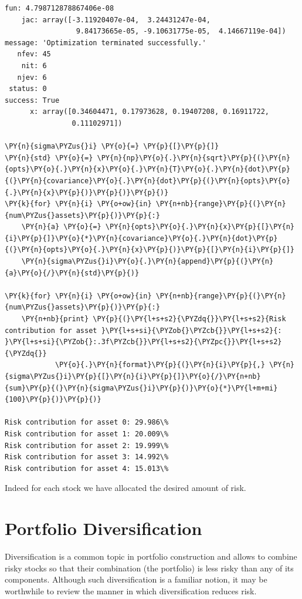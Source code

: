 \begin{tcolorbox}[breakable, size=fbox, boxrule=1pt, pad at break*=1mm,colback=cellbackground, colframe=cellborder]
\begin{Verbatim}[commandchars=\\\{\}]
    fun: 4.798712878867406e-08
    jac: array([-3.11920407e-04,  3.24431247e-04,  
                 9.84173665e-05, -9.10631775e-05,  4.14667119e-04])
message: 'Optimization terminated successfully.'
   nfev: 45
    nit: 6
   njev: 6
 status: 0
success: True
      x: array([0.34604471, 0.17973628, 0.19407208, 0.16911722, 
                0.11102971])
		
\PY{n}{sigma\PYZus{}i} \PY{o}{=} \PY{p}{[}\PY{p}{]}
\PY{n}{std} \PY{o}{=} \PY{n}{np}\PY{o}{.}\PY{n}{sqrt}\PY{p}{(}\PY{n}{opts}\PY{o}{.}\PY{n}{x}\PY{o}{.}\PY{n}{T}\PY{o}{.}\PY{n}{dot}\PY{p}{(}\PY{n}{covariance}\PY{o}{.}\PY{n}{dot}\PY{p}{(}\PY{n}{opts}\PY{o}{.}\PY{n}{x}\PY{p}{)}\PY{p}{)}\PY{p}{)} 
\PY{k}{for} \PY{n}{i} \PY{o+ow}{in} \PY{n+nb}{range}\PY{p}{(}\PY{n}{num\PYZus{}assets}\PY{p}{)}\PY{p}{:}
    \PY{n}{a} \PY{o}{=} \PY{n}{opts}\PY{o}{.}\PY{n}{x}\PY{p}{[}\PY{n}{i}\PY{p}{]}\PY{o}{*}\PY{n}{covariance}\PY{o}{.}\PY{n}{dot}\PY{p}{(}\PY{n}{opts}\PY{o}{.}\PY{n}{x}\PY{p}{)}\PY{p}{[}\PY{n}{i}\PY{p}{]} 
    \PY{n}{sigma\PYZus{}i}\PY{o}{.}\PY{n}{append}\PY{p}{(}\PY{n}{a}\PY{o}{/}\PY{n}{std}\PY{p}{)}
		
\PY{k}{for} \PY{n}{i} \PY{o+ow}{in} \PY{n+nb}{range}\PY{p}{(}\PY{n}{num\PYZus{}assets}\PY{p}{)}\PY{p}{:}
    \PY{n+nb}{print} \PY{p}{(}\PY{l+s+s2}{\PYZdq{}}\PY{l+s+s2}{Risk contribution for asset }\PY{l+s+si}{\PYZob{}\PYZcb{}}\PY{l+s+s2}{: }\PY{l+s+si}{\PYZob{}:.3f\PYZcb{}}\PY{l+s+s2}{\PYZpc{}}\PY{l+s+s2}{\PYZdq{}}
            \PY{o}{.}\PY{n}{format}\PY{p}{(}\PY{n}{i}\PY{p}{,} \PY{n}{sigma\PYZus{}i}\PY{p}{[}\PY{n}{i}\PY{p}{]}\PY{o}{/}\PY{n+nb}{sum}\PY{p}{(}\PY{n}{sigma\PYZus{}i}\PY{p}{)}\PY{o}{*}\PY{l+m+mi}{100}\PY{p}{)}\PY{p}{)}
		
Risk contribution for asset 0: 29.986\%
Risk contribution for asset 1: 20.009\%
Risk contribution for asset 2: 19.999\%
Risk contribution for asset 3: 14.992\%
Risk contribution for asset 4: 15.013\%
\end{Verbatim}
\end{tcolorbox}

Indeed for each stock we have allocated the desired amount of risk.

\section{Portfolio Diversification}

Diversification is a common topic in portfolio construction and allows to combine risky stocks so that their combination (the portfolio) is less risky than any of its components. Although such diversification is a familiar notion, it may be worthwhile to review the manner in which diversification reduces risk.

